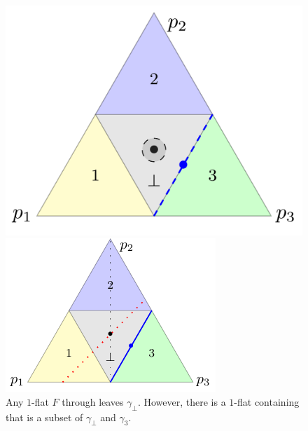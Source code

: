 \documentclass[anon,12pt]{colt2021} %
\newcommand{\Sc}{\mathcal{S}}  %
\begin{document}
\begin{figure}[ht]
\begin{minipage}{0.45\linewidth}
	\centering
	\includegraphics[width=\linewidth]{tikz/fsd-bound.pdf}
	\caption{%
		$\dim(\Sc_{\gamma_\bot}($\textbullet$)) = 2$ and $\dim(\Sc_{\gamma_\bot}(${\color{blue}\textbullet}$)) = 1$\vspace*{-5pt}}
	\label{fig:fsd-bound}
\end{minipage}
\hfill
\begin{minipage}{0.45\linewidth}
	\centering
	\includegraphics[width=\linewidth]{tikz/flats-bound.pdf}
	\caption{Any $1$-flat $F$ through \textbullet leaves $\gamma_\bot$.
	However, there is a $1$-flat containing {\color{blue} \textbullet} that is a subset of $\gamma_\bot$ and $\gamma_3$.
	}
	\label{fig:flats-bound}
\end{minipage}
\end{figure}
\end{document}
